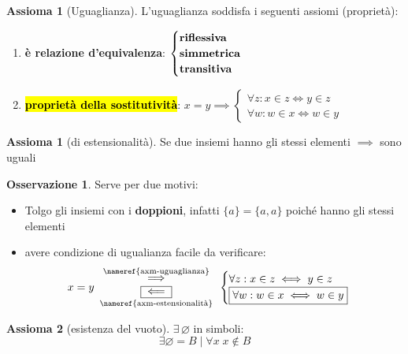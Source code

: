 \documentclass[a4paper,10pt]{article}
\theoremstyle{definition}
\theoremstyle{indentdefinition}
\theoremstyle{indentpostulate}
\newtheorem{axiom}{Assioma}[section]
\newtheorem*{axiom*}{Assioma}
\theoremstyle{indenttheorem}
\theoremstyle{myremark}
\newtheorem*{rem*}{Osservazione}
\theoremstyle{indentgeneral}
\begin{document}
\begin{axiom*}[Uguaglianza]\label{axm-uguaglianza} L'uguaglianza soddisfa i seguenti assiomi (proprietà):
\begin{enumerate}
    \item \textbf{è relazione d'equivalenza}: $\begin{cases}
        \text{\textbf{riflessiva}}\\
        \text{\textbf{simmetrica}}\\
        \text{\textbf{transitiva}}
    \end{cases}$
    \item \hl{\textbf{proprietà della sostitutività}}: $x=y\implies\begin{cases}
        \forall z: x\in z\iff y\in z\\
        \forall w: w\in x\iff w\in y
    \end{cases}$
\end{enumerate}
\end{axiom*}

\begin{axiom}[di estensionalità]\label{axm-estensionalità}
    Se due insiemi hanno gli stessi elementi $\implies$ sono uguali
\end{axiom}

\begin{rem*}
    Serve per due motivi:
    \begin{itemize}
        \item[1)] Tolgo gli insiemi con i \textbf{doppioni}, infatti $\{a\}=\{a,a\}$ poiché hanno gli stessi elementi
        \item[2)] avere condizione di ugualianza facile da verificare:
         $$x=y\begin{array}{c}
         \overset{\text{\nameref{axm-uguaglianza}}}{\implies}  \\
         \underset{\text{\nameref{axm-estensionalità}}}{\boxed{\impliedby}}
    \end{array}\begin{cases}
        \forall z: x\in z\iff y\in z\\
        \boxed{\forall w: w\in x\iff w\in y}
    \end{cases}$$
    \end{itemize}
\end{rem*}

\begin{axiom}[esistenza del vuoto]
    $\exists\,\varnothing$ in simboli: $$\exists\varnothing= B\mid \forall x\;x\notin B$$
\end{axiom}
\end{document}
